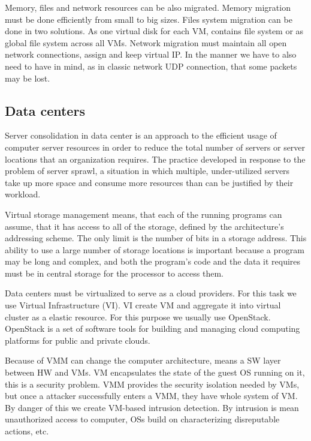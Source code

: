 \documentclass[12pt]{report}
\begin{document}
Memory, files and network resources can be also migrated. Memory migration must be done efficiently from small to big sizes. Files system migration can be done in two solutions. As one virtual disk for each VM, contains file system or as global file system across all VMs. Network migration must maintain all open network connections, assign and keep virtual IP. In the manner we have to also need to have in mind, as in classic network UDP connection, that some packets may be lost.

\subsection*{Data centers}

Server consolidation in data center is an approach to the efficient usage of computer server resources in order to reduce the total number of servers or server locations that an organization requires. The practice developed in response to the problem of server sprawl, a situation in which multiple, under-utilized servers take up more space and consume more resources than can be justified by their workload.

Virtual storage management means, that each of the running programs can assume, that it has access to all of the storage, defined by the architecture's addressing scheme. The only limit is the number of bits in a storage address. This ability to use a large number of storage locations is important because a program may be long and complex, and both the program's code and the data it requires must be in central storage for the processor to access them.

Data centers must be virtualized to serve as a cloud providers. For this task we use Virtual Infrastructure (VI). VI create VM and aggregate it into virtual cluster as a elastic resource. For this purpose we usually use OpenStack. OpenStack is a set of software tools for building and managing cloud computing platforms for public and private clouds.

Because of VMM can change the computer architecture, means a SW layer between HW and VMs. VM encapsulates the state of the guest OS running on it, this is a security problem. VMM provides the security isolation needed by VMs, but once a attacker successfully enters a VMM, they have whole system of VM.
By danger of this we create VM-based intrusion detection. By intrusion is mean unauthorized access to computer, OSs build on characterizing disreputable actions, etc. 
\end{document}
